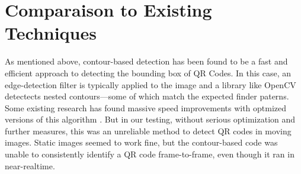 \documentclass[10pt,twocolumn,letterpaper]{article}
\begin{document}
\section{Comparaison to Existing Techniques}

As mentioned above, contour-based detection has been found to be a fast and efficient approach to detecting the bounding box of QR Codes. In this case, an edge-detection filter is typically applied to the image and a library like OpenCV detectects nested contours—some of which match the expected finder paterns. Some existing research has found massive speed improvements with optmized versions of this algorithm \cite{tong_qr_2014}. But in our testing, without serious optimization and further measures, this was an unreliable method to detect QR codes in moving images. Static images seemed to work fine, but the contour-based code was unable to consistently identify a QR code frame-to-frame, even though it ran in near-realtime.



{\small


}
\end{document}
